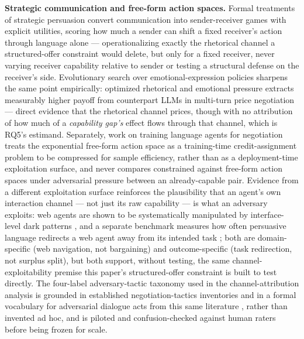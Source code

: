 \documentclass[11pt]{article}
\begin{document}
\textbf{Strategic communication and free-form action spaces.} Formal treatments of strategic persuasion \citep{StrategicPersuasion} convert communication into sender-receiver games with explicit utilities, scoring how much a sender can shift a fixed receiver's action through language alone --- operationalizing exactly the rhetorical channel a structured-offer constraint would delete, but only for a fixed receiver, never varying receiver capability relative to sender or testing a structural defense on the receiver's side. Evolutionary search over emotional-expression policies \citep{EvoEmo2509} sharpens the same point empirically: optimized rhetorical and emotional pressure extracts measurably higher payoff from counterpart LLMs in multi-turn price negotiation --- direct evidence that the rhetorical channel prices, though with no attribution of how much of a \emph{capability gap's} effect flows through that channel, which is RQ5's estimand. Separately, work on training language agents for negotiation \citep{ARIA} treats the exponential free-form action space as a training-time credit-assignment problem to be compressed for sample efficiency, rather than as a deployment-time exploitation surface, and never compares constrained against free-form action spaces under adversarial pressure between an already-capable pair. Evidence from a different exploitation surface reinforces the plausibility that an agent's own interaction channel --- not just its raw capability --- is what an adversary exploits: web agents are shown to be systematically manipulated by interface-level dark patterns \citep{Decepticon2512}, and a separate benchmark measures how often persuasive language redirects a web agent away from its intended task \citep{TRAP2512}; both are domain-specific (web navigation, not bargaining) and outcome-specific (task redirection, not surplus split), but both support, without testing, the same channel-exploitability premise this paper's structured-offer constraint is built to test directly. The four-label adversary-tactic taxonomy used in the channel-attribution analysis is grounded in established negotiation-tactics inventories and in a formal vocabulary for adversarial dialogue acts from this same literature \citep{BEDA2512}, rather than invented ad hoc, and is piloted and confusion-checked against human raters before being frozen for scale.
\end{document}
